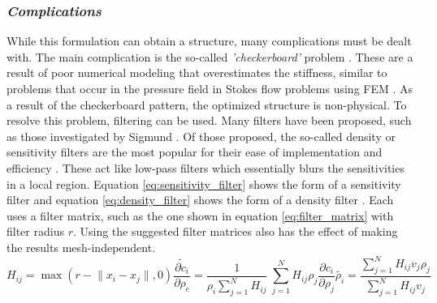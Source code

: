 \subsubsection*{\emph{Complications}}
While this formulation can obtain a structure, many complications must be dealt with. The main complication is the so-called \emph{'checkerboard'} problem \cite{Bendsøe_2004}. These are a result of poor numerical modeling that overestimates the stiffness, similar to problems that occur in the pressure field in Stokes flow problems using FEM \cite{Bendsøe_2004}. As a result of the checkerboard pattern, the optimized structure is non-physical. To resolve this problem, filtering can be used. Many filters have been proposed, such as those investigated by Sigmund \cite{Sigmund_2007}. Of those proposed, the so-called density or sensitivity filters are the most popular for their ease of implementation and efficiency \cite{Sigmund_2007}. These act like low-pass filters which essentially blurs the sensitivities in a local region. Equation \ref{eq:sensitivity_filter} shows the form of a sensitivity filter \cite{Sigmund_1997} and equation \ref{eq:density_filter} shows the form of a density filter \cite{Bruns_Tortorelli_2001}. Each uses a filter matrix, such as the one shown in equation \ref{eq:filter_matrix} with filter radius $r$. Using the suggested filter matrices also has the effect of making the results mesh-independent.
\begin{subequations}
    \begin{equation}
        H_{ij} = \max(r-\lVert x_i - x_j \rVert, 0)
        \label{eq:filter_matrix}
    \end{equation}
    \begin{equation}
        \widetilde{\frac{\partial c_i}{\partial \rho_e}} = \frac{1}{\rho_i \sum_{j=1}^N H_{ij}} \ \sum_{j=1}^N H_{ij}\rho_j \frac{\partial c_i}{\partial \rho_j}
        \label{eq:sensitivity_filter}
    \end{equation}
    \begin{equation}
        \widetilde{\rho_i} = \frac{\sum_{j=1}^N H_{ij}v_j\rho_j}{\sum_{j=1}^N H_{ij}v_j}
        \label{eq:density_filter}
    \end{equation}
\end{subequations}


